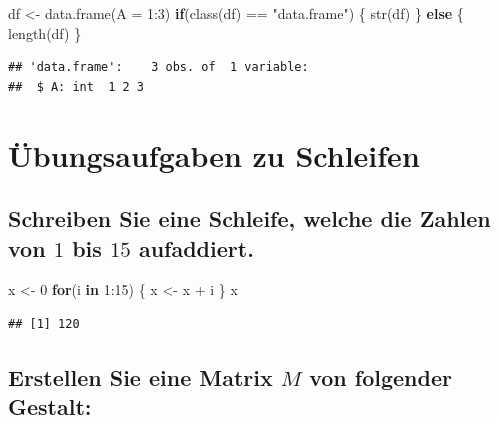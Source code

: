 \documentclass[12pt,a4paper]{article}
\newenvironment{Shaded}{\begin{snugshade}}{\end{snugshade}}
\newcommand{\AttributeTok}[1]{\textcolor[rgb]{0.77,0.63,0.00}{#1}}
\newcommand{\ControlFlowTok}[1]{\textcolor[rgb]{0.13,0.29,0.53}{\textbf{#1}}}
\newcommand{\DecValTok}[1]{\textcolor[rgb]{0.00,0.00,0.81}{#1}}
\newcommand{\FunctionTok}[1]{\textcolor[rgb]{0.00,0.00,0.00}{#1}}
\newcommand{\NormalTok}[1]{#1}
\newcommand{\OtherTok}[1]{\textcolor[rgb]{0.56,0.35,0.01}{#1}}
\newcommand{\SpecialCharTok}[1]{\textcolor[rgb]{0.00,0.00,0.00}{#1}}
\newcommand{\StringTok}[1]{\textcolor[rgb]{0.31,0.60,0.02}{#1}}
\begin{document}
\begin{Shaded}
\begin{Highlighting}[]
\NormalTok{    df }\OtherTok{\textless{}{-}} \FunctionTok{data.frame}\NormalTok{(}\AttributeTok{A =} \DecValTok{1}\SpecialCharTok{:}\DecValTok{3}\NormalTok{)}
    \ControlFlowTok{if}\NormalTok{(}\FunctionTok{class}\NormalTok{(df) }\SpecialCharTok{==} \StringTok{"data.frame"}\NormalTok{) \{}
      \FunctionTok{str}\NormalTok{(df)}
\NormalTok{    \} }\ControlFlowTok{else}\NormalTok{ \{}
      \FunctionTok{length}\NormalTok{(df)}
\NormalTok{    \}}
\end{Highlighting}
\end{Shaded}

\begin{verbatim}
## 'data.frame':    3 obs. of  1 variable:
##  $ A: int  1 2 3
\end{verbatim}

\hypertarget{uxfcbungsaufgaben-zu-schleifen}{%
\section{Übungsaufgaben zu
Schleifen}\label{uxfcbungsaufgaben-zu-schleifen}}

\hypertarget{schreiben-sie-eine-schleife-welche-die-zahlen-von-1-bis-15-aufaddiert.}{%
\subsection{\texorpdfstring{Schreiben Sie eine Schleife, welche die
Zahlen von \(1\) bis \(15\)
aufaddiert.}{Schreiben Sie eine Schleife, welche die Zahlen von 1 bis 15 aufaddiert.}}\label{schreiben-sie-eine-schleife-welche-die-zahlen-von-1-bis-15-aufaddiert.}}

\begin{Shaded}
\begin{Highlighting}[]
\NormalTok{    x }\OtherTok{\textless{}{-}} \DecValTok{0}
    \ControlFlowTok{for}\NormalTok{(i }\ControlFlowTok{in} \DecValTok{1}\SpecialCharTok{:}\DecValTok{15}\NormalTok{) \{}
\NormalTok{      x }\OtherTok{\textless{}{-}}\NormalTok{ x }\SpecialCharTok{+}\NormalTok{ i}
\NormalTok{    \}}
\NormalTok{    x}
\end{Highlighting}
\end{Shaded}

\begin{verbatim}
## [1] 120
\end{verbatim}

\hypertarget{erstellen-sie-eine-matrix-m-von-folgender-gestalt}{%
\subsection{\texorpdfstring{Erstellen Sie eine Matrix \(M\) von
folgender
Gestalt:}{Erstellen Sie eine Matrix M von folgender Gestalt:}}\label{erstellen-sie-eine-matrix-m-von-folgender-gestalt}}
\end{document}
